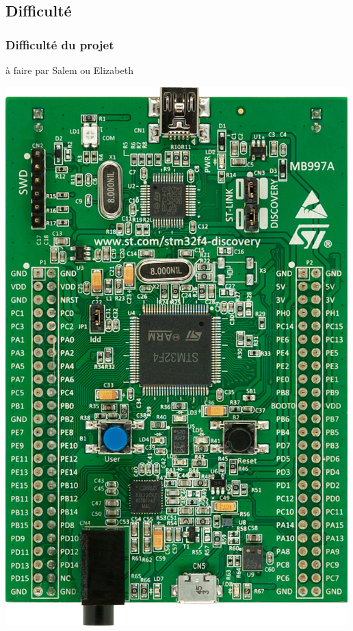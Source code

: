 \documentclass{beamer}
\begin{document}
\subsection{Difficulté}
\begin{frame}
\frametitle{Difficulté du projet}
à faire par Salem ou Elizabeth
\begin{center}
 \includegraphics[scale=0.1]{../images/stm32f4_discovery.jpg}
\end{center}
\end{frame}
\end{document}
